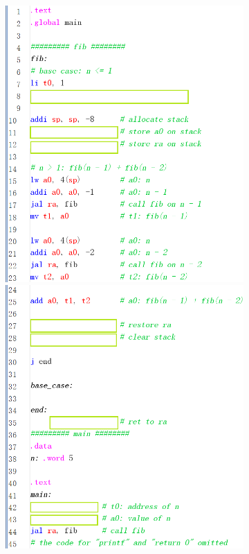 
\begin{figure}[h]
	\centering
	\begin{subfigure}[c]{0.46\textwidth}
			\centering
			\includegraphics[width = 1.00\textwidth]{figs/fib-rec-wrong-23-blank.png}
			\includegraphics[width = 1.00\textwidth]{figs/fib-rec-wrong-46-blank.png}

\end{subfigure}
\end{figure}
